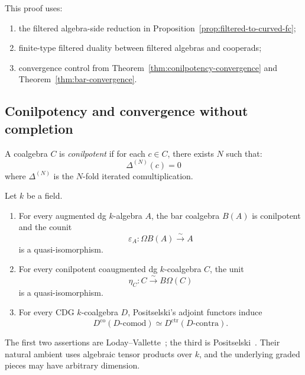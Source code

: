 \begin{remark}[Dependencies]
This proof uses:
\begin{enumerate}[label=(D\arabic*)]
\item the filtered algebra-side reduction in
Proposition~\ref{prop:filtered-to-curved-fc};
\item finite-type filtered duality between filtered algebras and cooperads;
\item convergence control from Theorem~\ref{thm:conilpotency-convergence} and
Theorem~\ref{thm:bar-convergence}.
\end{enumerate}
\end{remark}

\subsection{Conilpotency and convergence without completion}
\label{sec:conilpotency-convergence}

\begin{definition}
\label{def:conilpotent-complete}
A coalgebra $C$ is \emph{conilpotent} if for each $c \in C$, there exists $N$ such that:
\begin{equation}
\Delta^{(N)}(c) = 0
\end{equation}
where $\Delta^{(N)}$ is the $N$-fold iterated comultiplication.
\end{definition}

\begin{theorem}
\label{thm:conilpotency-convergence}
\label{thm:conilpotency-bar}
\label{thm:koszul-conilpotent}
Let \(k\) be a field.
\begin{enumerate}[label=\textup{(\roman*)}]
\item For every augmented dg \(k\)-algebra \(A\), the bar coalgebra
 \(B(A)\) is conilpotent and the counit
 \[
  \varepsilon_A\colon\Omega B(A)\xrightarrow{\sim}A
 \]
 is a quasi-isomorphism.
\item For every conilpotent coaugmented dg \(k\)-coalgebra \(C\), the
 unit
 \[
  \eta_C\colon C\xrightarrow{\sim}B\Omega(C)
 \]
 is a quasi-isomorphism.
\item For every CDG \(k\)-coalgebra \(D\), Positselski's adjoint
 functors induce
 \[
  D^{\mathrm{co}}(D\text{-}\mathrm{comod})
  \simeq
  D^{\mathrm{ctr}}(D\text{-}\mathrm{contra}).
 \]
\end{enumerate}
The first two assertions are
Loday--Vallette~\cite[Corollary~2.3.4]{LV12}; the third is
Positselski~\cite[Theorem~5.2]{Positselski11}.  Their natural ambient
uses algebraic tensor products over \(k\), and the underlying graded
pieces may have arbitrary dimension.
\end{theorem}

